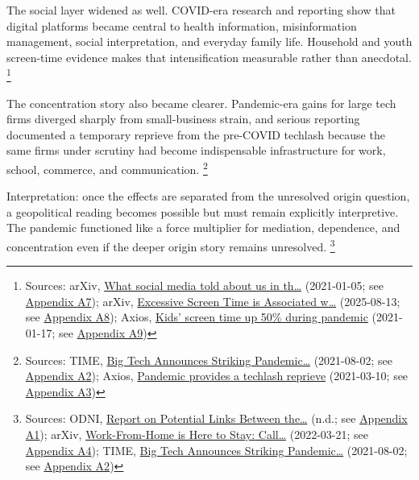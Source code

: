 \documentclass[
  american,
  11pt,
  letterpaper,
]{article}
\begin{document}
The social layer widened as well. COVID-era research and reporting show
that digital platforms became central to health information,
misinformation management, social interpretation, and everyday family
life. Household and youth screen-time evidence makes that
intensification measurable rather than anecdotal. \footnote{Sources:
  arXiv, \href{https://arxiv.org/abs/2101.01688}{What social media told
  about us in th\ldots{}} (2021-01-05; see
  \hyperref[ch-03-appendix-a7-what-social-media-told-about-us-in-the-time-of-covid-19-a-scoping-review]{Appendix
  A7}); arXiv, \href{https://arxiv.org/abs/2508.10062}{Excessive Screen
  Time is Associated w\ldots{}} (2025-08-13; see
  \hyperref[ch-03-appendix-a8-excessive-screen-time-is-associated-with-mental-health-problems-and-adhd-in-us-children-and-adolescents-physical-activity-and-sleep-as-parallel-mediators]{Appendix
  A8}); Axios,
  \href{https://www.axios.com/2021/01/17/kids-screen-time-pandemic}{Kids'
  screen time up 50\% during pandemic} (2021-01-17; see
  \hyperref[ch-03-appendix-a9-kids-screen-time-up-50-during-pandemic]{Appendix
  A9})}

The concentration story also became clearer. Pandemic-era gains for
large tech firms diverged sharply from small-business strain, and
serious reporting documented a temporary reprieve from the pre-COVID
techlash because the same firms under scrutiny had become indispensable
infrastructure for work, school, commerce, and communication.
\footnote{Sources: TIME,
  \href{https://time.com/6085674/big-tech-apple-microsoft-facebook-amazon-google-earnings/}{Big
  Tech Announces Striking Pandemic\ldots{}} (2021-08-02; see
  \hyperref[ch-03-appendix-a2-big-tech-announces-striking-pandemic-gains-as-small-businesses-strain-to-find-their-footing]{Appendix
  A2}); Axios,
  \href{https://www.axios.com/2021/03/10/pandemic-provides-techlash-reprieve}{Pandemic
  provides a techlash reprieve} (2021-03-10; see
  \hyperref[ch-03-appendix-a3-pandemic-provides-a-techlash-reprieve]{Appendix
  A3})}

Interpretation: once the effects are separated from the unresolved
origin question, a geopolitical reading becomes possible but must remain
explicitly interpretive. The pandemic functioned like a force multiplier
for mediation, dependence, and concentration even if the deeper origin
story remains unresolved. \footnote{Sources: ODNI,
  \href{https://www.dni.gov/files/ODNI/documents/assessments/Report-on-Potential-Links-Between-the-Wuhan-Institute-of-Virology-and-the-Origins-of-COVID-19-20230623.pdf}{Report
  on Potential Links Between the\ldots{}} (n.d.; see
  \hyperref[ch-03-appendix-a1-report-on-potential-links-between-the-wuhan-institute-of-virology-and-the-origins-of-covid-19]{Appendix
  A1}); arXiv, \href{https://arxiv.org/abs/2203.11136}{Work-From-Home is
  Here to Stay: Call\ldots{}} (2022-03-21; see
  \hyperref[ch-03-appendix-a4-work-from-home-is-here-to-stay-call-for-flexibility-in-post-pandemic-work-policies]{Appendix
  A4}); TIME,
  \href{https://time.com/6085674/big-tech-apple-microsoft-facebook-amazon-google-earnings/}{Big
  Tech Announces Striking Pandemic\ldots{}} (2021-08-02; see
  \hyperref[ch-03-appendix-a2-big-tech-announces-striking-pandemic-gains-as-small-businesses-strain-to-find-their-footing]{Appendix
  A2})}
\end{document}
